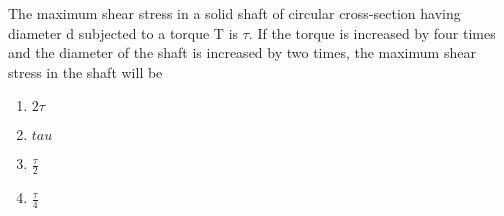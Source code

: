 \item The maximum shear stress in a solid shaft of circular cross-section having diameter d subjected to a torque T is $\tau$. If the torque is increased by four times and the diameter of the shaft is increased by two times, the maximum shear stress in the shaft will be
\begin{multicols}{2}
    \begin{enumerate}
        \item $2\tau$
        \item $tau$
        \item $\frac{\tau}{2}$
        \item $\frac{\tau}{4}$
    \end{enumerate}
\end{multicols}
